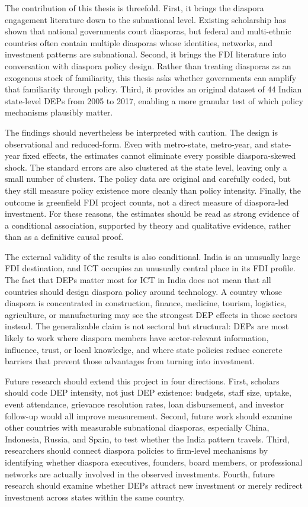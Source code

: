 \documentclass[doublespace,nopageskip]{UVAthesis}
\begin{document}
The contribution of this thesis is threefold. First, it brings the diaspora engagement literature down to the subnational level. Existing scholarship has shown that national governments court diasporas, but federal and multi-ethnic countries often contain multiple diasporas whose identities, networks, and investment patterns are subnational. Second, it brings the FDI literature into conversation with diaspora policy design. Rather than treating diasporas as an exogenous stock of familiarity, this thesis asks whether governments can amplify that familiarity through policy. Third, it provides an original dataset of 44 Indian state-level DEPs from 2005 to 2017, enabling a more granular test of which policy mechanisms plausibly matter.

The findings should nevertheless be interpreted with caution. The design is observational and reduced-form. Even with metro-state, metro-year, and state-year fixed effects, the estimates cannot eliminate every possible diaspora-skewed shock. The standard errors are also clustered at the state level, leaving only a small number of clusters. The policy data are original and carefully coded, but they still measure policy existence more cleanly than policy intensity. Finally, the outcome is greenfield FDI project counts, not a direct measure of diaspora-led investment. For these reasons, the estimates should be read as strong evidence of a conditional association, supported by theory and qualitative evidence, rather than as a definitive causal proof.

The external validity of the results is also conditional. India is an unusually large FDI destination, and ICT occupies an unusually central place in its FDI profile. The fact that DEPs matter most for ICT in India does not mean that all countries should design diaspora policy around technology. A country whose diaspora is concentrated in construction, finance, medicine, tourism, logistics, agriculture, or manufacturing may see the strongest DEP effects in those sectors instead. The generalizable claim is not sectoral but structural: DEPs are most likely to work where diaspora members have sector-relevant information, influence, trust, or local knowledge, and where state policies reduce concrete barriers that prevent those advantages from turning into investment.

Future research should extend this project in four directions. First, scholars should code DEP intensity, not just DEP existence: budgets, staff size, uptake, event attendance, grievance resolution rates, loan disbursement, and investor follow-up would all improve measurement. Second, future work should examine other countries with measurable subnational diasporas, especially China, Indonesia, Russia, and Spain, to test whether the India pattern travels. Third, researchers should connect diaspora policies to firm-level mechanisms by identifying whether diaspora executives, founders, board members, or professional networks are actually involved in the observed investments. Fourth, future research should examine whether DEPs attract new investment or merely redirect investment across states within the same country.
\end{document}
